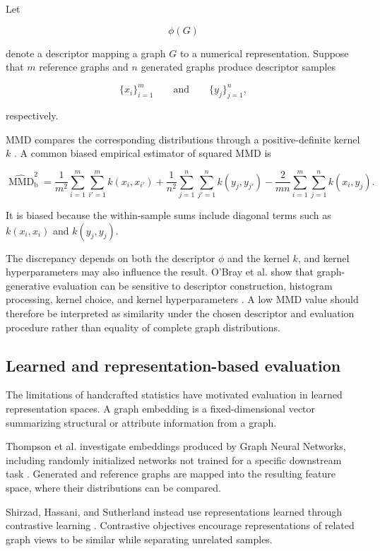 Let

\[
\phi(G)
\]

denote a descriptor mapping a graph \(G\) to a numerical representation. Suppose that \(m\) reference graphs and \(n\) generated graphs produce descriptor samples

\[
\{x_i\}_{i=1}^{m}
\qquad\text{and}\qquad
\{y_j\}_{j=1}^{n},
\]

respectively.

MMD compares the corresponding distributions through a positive-definite kernel \(k\) \cite{gretton2012kernel}. A common biased empirical estimator of squared MMD is

\[
\widehat{\operatorname{MMD}}_{\mathrm{b}}^2
=
\frac{1}{m^2}
\sum_{i=1}^{m}
\sum_{i'=1}^{m}
k(x_i,x_{i'})
+
\frac{1}{n^2}
\sum_{j=1}^{n}
\sum_{j'=1}^{n}
k(y_j,y_{j'})
-
\frac{2}{mn}
\sum_{i=1}^{m}
\sum_{j=1}^{n}
k(x_i,y_j).
\]

It is biased because the within-sample sums include diagonal terms such as \(k(x_i,x_i)\) and \(k(y_j,y_j)\).

The discrepancy depends on both the descriptor \(\phi\) and the kernel \(k\), and kernel hyperparameters may also influence the result. O'Bray et al. show that graph-generative evaluation can be sensitive to descriptor construction, histogram processing, kernel choice, and kernel hyperparameters \cite{obray2022evaluation}. A low MMD value should therefore be interpreted as similarity under the chosen descriptor and evaluation procedure rather than equality of complete graph distributions.


\subsection{Learned and representation-based evaluation}
\label{subsec:rw_learned_evaluation}

The limitations of handcrafted statistics have motivated evaluation in learned representation spaces. A graph embedding is a fixed-dimensional vector summarizing structural or attribute information from a graph.

Thompson et al. investigate embeddings produced by Graph Neural Networks, including randomly initialized networks not trained for a specific downstream task \cite{thompson2022evaluation}. Generated and reference graphs are mapped into the resulting feature space, where their distributions can be compared.

Shirzad, Hassani, and Sutherland instead use representations learned through contrastive learning \cite{shirzad2022evaluating}. Contrastive objectives encourage representations of related graph views to be similar while separating unrelated samples.

